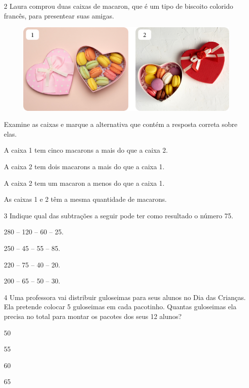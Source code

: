 \num{2} Laura comprou duas caixas de macaron, que é um tipo de biscoito colorido
francês, para presentear suas amigas. 

\begin{figure}[H]
\centering
\includegraphics[width=.8\textwidth]{./media/image152.png}
\end{figure}

Examine as caixas e marque a
alternativa que contém a resposta correta sobre elas.

\begin{escolha}[itemsep=-5pt]
\item A caixa 1 tem cinco macarons a mais do que a caixa 2.

\item A caixa 2 tem dois macarons a mais do que a caixa 1.

\item A caixa 2 tem um macaron a menos do que a caixa 1.

\item As caixas 1 e 2 têm a mesma quantidade de macarons.
\end{escolha}

\num{3} Indique qual das subtrações a seguir pode ter como resultado o número 75.

\begin{escolha}[itemsep=-5pt]
\item 280 -- 120 -- 60 -- 25.

\item 250 -- 45 -- 55 -- 85.

\item 220 -- 75 -- 40 -- 20.

\item 200 -- 65 -- 50 -- 30.
\end{escolha}

\num{4} Uma professora vai distribuir guloseimas para seus alunos no Dia das
Crianças. Ela pretende colocar 5 guloseimas em cada pacotinho. Quantas
guloseimas ela precisa no total para montar os pacotes dos seus 12
alunos?

\begin{escolha}[itemsep=-5pt]
\begin{multicols}{4}
\item 50

\item 55

\item 60

\item 65
\end{multicols}
\end{escolha}

